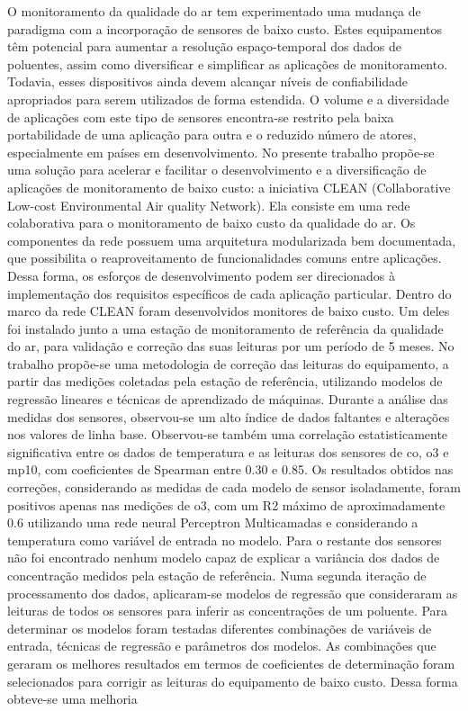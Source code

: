 
\setlength{\absparsep}{18pt} %
\begin{resumo}
	\SingleSpacing
	O monitoramento da qualidade do ar tem experimentado uma mudança de paradigma com a incorporação de sensores de baixo custo. Estes equipamentos têm potencial para aumentar a resolução espaço-temporal dos dados de poluentes, assim como diversificar e simplificar as aplicações de monitoramento. Todavia, esses dispositivos ainda devem alcançar níveis de confiabilidade apropriados para serem utilizados de forma estendida. O volume e a diversidade de aplicações com este tipo de sensores encontra-se restrito pela baixa portabilidade de uma aplicação para outra e o reduzido número de atores, especialmente em países em desenvolvimento. No presente trabalho propõe-se uma solução para acelerar e facilitar o desenvolvimento e a diversificação de aplicações de monitoramento de baixo custo: a iniciativa CLEAN (Collaborative Low-cost Environmental Air quality Network). Ela consiste em uma rede colaborativa para o monitoramento de baixo custo da qualidade do ar. Os componentes da rede possuem uma arquitetura modularizada bem documentada, que possibilita o reaproveitamento de funcionalidades comuns entre aplicações. Dessa forma, os esforços de desenvolvimento podem ser direcionados à implementação dos requisitos específicos de cada aplicação particular. Dentro do marco da rede CLEAN foram desenvolvidos monitores de baixo custo. Um deles foi instalado junto a uma estação de monitoramento de referência da qualidade do ar, para validação e correção das suas leituras por um período de 5 meses. No trabalho propõe-se uma metodologia de correção das leituras do equipamento, a partir das medições coletadas pela estação de referência, utilizando modelos de regressão lineares e técnicas de aprendizado de máquinas. Durante a análise das medidas dos sensores, observou-se um alto índice de dados faltantes e alterações nos valores de linha base. Observou-se também uma correlação estatisticamente significativa entre os dados de temperatura e as leituras dos sensores de \acrshort{co}, \acrshort{o3} e \acrshort{mp10}, com coeficientes de Spearman entre 0.30 e 0.85. Os resultados obtidos nas correções, considerando as medidas de cada modelo de sensor isoladamente, foram positivos apenas nas medições de \acrshort{o3}, com um R2 máximo de aproximadamente 0.6 utilizando uma rede neural Perceptron Multicamadas e considerando a temperatura como variável de entrada no modelo. Para o restante dos sensores não foi encontrado nenhum modelo capaz de explicar a variância dos dados de concentração medidos pela estação de referência. Numa segunda iteração de processamento dos dados, aplicaram-se modelos de regressão que consideraram as leituras de todos os sensores para inferir as concentrações de um poluente. Para determinar os modelos foram testadas diferentes combinações de variáveis de entrada, técnicas de regressão e parâmetros dos modelos. As combinações que geraram os melhores resultados em termos de coeficientes de determinação foram selecionados para corrigir as leituras do equipamento de baixo custo. Dessa forma obteve-se uma melhoria 
\end{resumo}

